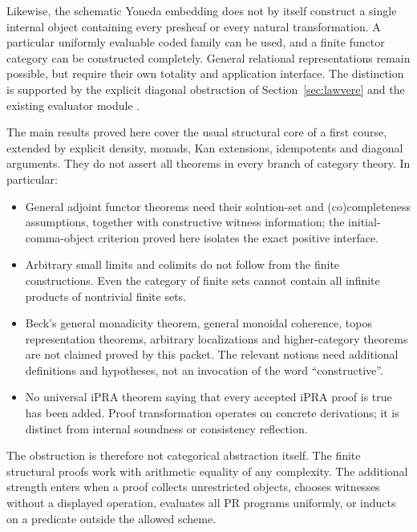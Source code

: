 Likewise, the schematic Yoneda embedding does not by itself construct a
single internal object containing every presheaf or every natural
transformation. A particular uniformly evaluable coded family can be
used, and a finite functor category can be constructed completely.
General relational representations remain possible, but require their
own totality and application interface. The distinction is supported
by the explicit diagonal obstruction of Section~\ref{sec:lawvere} and
the existing evaluator module \cite{repo-evaluator}.

The main results proved here cover the usual structural core of a first
course, extended by explicit density, monads, Kan extensions, idempotents
and diagonal arguments. They do not assert all theorems in every branch
of category theory. In particular:
\begin{itemize}
\item General adjoint functor theorems need their solution-set and
      (co)completeness assumptions, together with constructive witness
      information; the initial-comma-object criterion proved here
      isolates the exact positive interface.
\item Arbitrary small limits and colimits do not follow from the finite
      constructions. Even the category of finite sets cannot contain
      all infinite products of nontrivial finite sets.
\item Beck's general monadicity theorem, general monoidal coherence,
      topos representation theorems, arbitrary localizations and
      higher-category theorems are not claimed proved by this packet.
      The relevant notions need additional definitions and hypotheses,
      not an invocation of the word ``constructive''.
\item No universal iPRA theorem saying that every accepted iPRA proof
      is true has been added. Proof transformation operates on concrete
      derivations; it is distinct from internal soundness or consistency
      reflection.
\end{itemize}

The obstruction is therefore not categorical abstraction itself. The
finite structural proofs work with arithmetic equality of any complexity.
The additional strength enters when a proof collects unrestricted objects,
chooses witnesses without a displayed operation, evaluates all PR programs
uniformly, or inducts on a predicate outside the allowed scheme.
